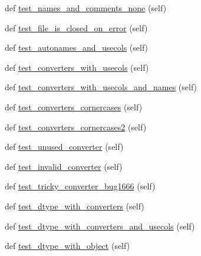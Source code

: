 \begin{DoxyCompactItemize}
\item 
def \hyperlink{classnumpy_1_1lib_1_1tests_1_1test__io_1_1TestFromTxt_af1ae63e44e53a2ca3239e28a9eebfce0}{test\+\_\+names\+\_\+and\+\_\+comments\+\_\+none} (self)
\item 
def \hyperlink{classnumpy_1_1lib_1_1tests_1_1test__io_1_1TestFromTxt_a74204effc6dccaaf707aaa074af5a7aa}{test\+\_\+file\+\_\+is\+\_\+closed\+\_\+on\+\_\+error} (self)
\item 
def \hyperlink{classnumpy_1_1lib_1_1tests_1_1test__io_1_1TestFromTxt_a56d4c0bbbfb516837c430d9b9363bd85}{test\+\_\+autonames\+\_\+and\+\_\+usecols} (self)
\item 
def \hyperlink{classnumpy_1_1lib_1_1tests_1_1test__io_1_1TestFromTxt_a107e5990503d5ba96f760fef42e1d1b9}{test\+\_\+converters\+\_\+with\+\_\+usecols} (self)
\item 
def \hyperlink{classnumpy_1_1lib_1_1tests_1_1test__io_1_1TestFromTxt_a33b1d46acb4f32d82985d07b33b6d0dc}{test\+\_\+converters\+\_\+with\+\_\+usecols\+\_\+and\+\_\+names} (self)
\item 
def \hyperlink{classnumpy_1_1lib_1_1tests_1_1test__io_1_1TestFromTxt_aff4887debf099d3bc7e7c315a33de331}{test\+\_\+converters\+\_\+cornercases} (self)
\item 
def \hyperlink{classnumpy_1_1lib_1_1tests_1_1test__io_1_1TestFromTxt_a0afe2d9da9442ffd777c00483cfad532}{test\+\_\+converters\+\_\+cornercases2} (self)
\item 
def \hyperlink{classnumpy_1_1lib_1_1tests_1_1test__io_1_1TestFromTxt_a95048c4f2327a750c976d01e8688f45b}{test\+\_\+unused\+\_\+converter} (self)
\item 
def \hyperlink{classnumpy_1_1lib_1_1tests_1_1test__io_1_1TestFromTxt_aae632cbf4f5cd114fd4f645aeff544db}{test\+\_\+invalid\+\_\+converter} (self)
\item 
def \hyperlink{classnumpy_1_1lib_1_1tests_1_1test__io_1_1TestFromTxt_a2eee7f7fb518a10c1da751f081dd50d8}{test\+\_\+tricky\+\_\+converter\+\_\+bug1666} (self)
\item 
def \hyperlink{classnumpy_1_1lib_1_1tests_1_1test__io_1_1TestFromTxt_a399c509dacdb487d4f5c3c77601e361f}{test\+\_\+dtype\+\_\+with\+\_\+converters} (self)
\item 
def \hyperlink{classnumpy_1_1lib_1_1tests_1_1test__io_1_1TestFromTxt_a98cd9e93ffbecf3ab47d733afd216694}{test\+\_\+dtype\+\_\+with\+\_\+converters\+\_\+and\+\_\+usecols} (self)
\item 
def \hyperlink{classnumpy_1_1lib_1_1tests_1_1test__io_1_1TestFromTxt_a54f1c5f97e14a05a0878c2d8a90f3c9d}{test\+\_\+dtype\+\_\+with\+\_\+object} (self)

\end{DoxyCompactItemize}
